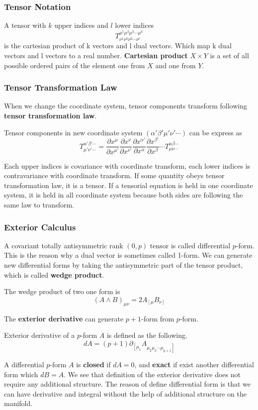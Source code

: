 \documentclass[12pt]{article}
\theoremstyle{mystyle}{\newtheorem{definition}{Definition}[section]}
\theoremstyle{mystyle}{\newtheorem{theorem}[definition]{Theorem}}
\theoremstyle{mystyle}{\newtheorem*{remark}{Remark}}
\theoremstyle{mystyle}{\newtheorem*{example}{Example}}
\theoremstyle{mystyle}{\newtheorem*{examples}{Examples}}
\theoremstyle{cstyle}{\newtheorem*{cthm}{}}
\begin{document}
\subsubsection{Tensor Notation}
A tensor with \(k\) upper indices and \(l\) lower indices
\[T^{\mu^1 \mu^2 \mu^3 \cdots \mu^k}_{\nu^1\nu^2\nu^2\cdots \nu^l}\]
is the cartesian product of k vectors and l dual vectors. Which map k dual vectors and l vectors to a real number.
\textbf{Cartesian product} $X \times Y$ is a set of all possible ordered pairs of the element one from $X$ and one from $Y$.

\subsubsection{Tensor Transformation Law}
When we change the coordinate system, tensor components transform following \textbf{tensor transformation law}.
\begin{definition}
  Tensor components in new coordinate system \((\alpha'\beta'\mu'\nu'\cdots)\) can be express as
  \[T^{\alpha'\beta'\cdots}_{\mu'\nu'\cdots} =
    \frac{\partial x^{\mu}}{\partial x^{\mu'}}\frac{\partial x^{\nu}}{\partial x^{\nu'}}\frac{\partial x^{\alpha'}}{\partial x^{\alpha}}
    \frac{\partial x^{\beta'}}{\partial x^{\beta}} \cdots
    T^{\alpha\beta\cdots}_{\mu\nu\cdots}\]
\end{definition}
Each upper indices is covariance with coordinate transform, each lower indices is contravariance with coordinate transform.
If some quantity obeys tensor transformation law, it is a tensor. If a tensorial equation is held in one coordinate system,
it is held in all coordinate
system because both sides are following the same law to transform.

\subsubsection{Exterior Calculus}
A covariant totally antisymmetric rank \((0,p)\) tensor is called differential \(p\)-form. This is the reason why a dual vector is sometimes called 1-form.
We can generate new differential forms by taking the antisymmetric part of the tensor product, which is called \textbf{wedge product}.
\begin{example}
  The wedge product of two one form is \[(A\wedge B)_{\mu\nu}= 2A_{\left[\mu\right.}B_{\left.\nu\right]}\]
\end{example}
The \textbf{exterior derivative} can generate \(p+1\)-form from \(p\)-form.
\begin{definition}
  Exterior derivative of a \(p\)-form \(A\) is defined as the following.
  \[dA = (p+1)\partial_{\left[\mu_1\right.}A_{\left.\mu_2\mu_3\cdots\mu_{p+1}\right]}\]
\end{definition}
A differential \(p\)-form \(A\) is \textbf{closed} if \(dA =0\), and \textbf{exact} if exist another differential form which \(dB = A\).
We see that definition of the exterior derivative does not require any additional structure.
The reason of define differential form is that we can have derivative and integral without the help of additional structure on the manifold.
\end{document}
